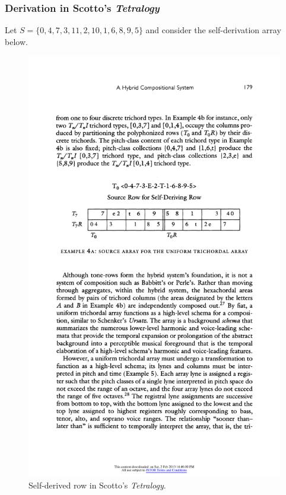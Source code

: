 
\begin{frame}
	\frametitle{Derivation in Scotto's \emph{Tetralogy}}
	Let $S = \{ 0, 4, 7, 3, 11, 2, 10, 1, 6, 8, 9, 5 \}$ and consider the self-derivation array below.
    \begin{figure}
    	\centering
    	\includegraphics[width=\textwidth]{figures/scotto-array.pdf}
		\caption{Self-derived row in Scotto's \emph{Tetralogy}.}
	\end{figure}
\end{frame}

